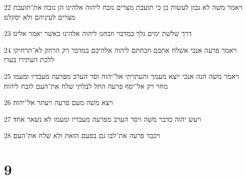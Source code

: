 \par 22 ויאמר משׁה לא נכון לעשׂות כן כי תועבת מצרים נזבח ליהוה אלהינו הן נזבח את־תועבת מצרים לעיניהם ולא יסקלנו׃
\par 23 דרך שׁלשׁת ימים נלך במדבר וזבחנו ליהוה אלהינו כאשׁר יאמר אלינו׃
\par 24 ויאמר פרעה אנכי אשׁלח אתכם וזבחתם ליהוה אלהיכם במדבר רק הרחק לא־תרחיקו ללכת העתירו בעדי׃
\par 25 ויאמר משׁה הנה אנכי יוצא מעמך והעתרתי אל־יהוה וסר הערב מפרעה מעבדיו ומעמו מחר רק אל־יסף פרעה התל לבלתי שׁלח את־העם לזבח ליהוה׃
\par 26 ויצא משׁה מעם פרעה ויעתר אל־יהוה׃
\par 27 ויעשׂ יהוה כדבר משׁה ויסר הערב מפרעה מעבדיו ומעמו לא נשׁאר אחד׃
\par 28 ויכבד פרעה את־לבו גם בפעם הזאת ולא שׁלח את־העם׃

\chapter{9}

